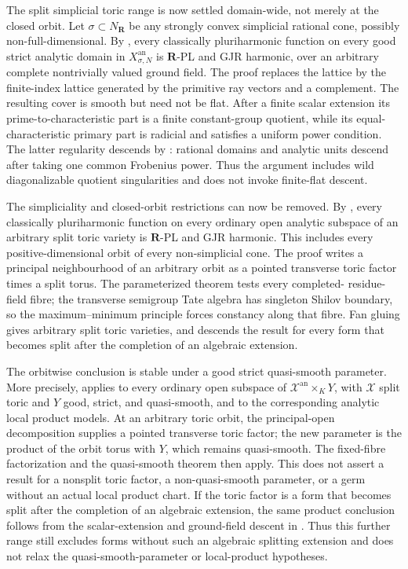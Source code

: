 The split simplicial toric range is now settled domain-wide, not merely at
the closed orbit.  Let \(\sigma\subset N_{\mathbf R}\) be any strongly
convex simplicial rational cone, possibly non-full-dimensional.  By
, every classically pluriharmonic
function on every good strict analytic domain in
\(X_{\sigma,N}^{\mathrm{an}}\) is \(\mathbf R\)-PL and GJR harmonic, over
an arbitrary complete nontrivially valued ground field.  The proof replaces
the lattice by the finite-index lattice generated by the primitive ray
vectors and a complement.  The resulting cover is smooth but need not be
flat.  After a finite scalar extension its prime-to-characteristic part is
a finite constant-group quotient, while its equal-characteristic primary
part is radicial and satisfies a uniform power condition.  The latter
regularity descends by : rational
domains and analytic units descend after taking one common Frobenius power.
Thus the argument includes wild diagonalizable quotient singularities and
does not invoke finite-flat descent.

The simpliciality and closed-orbit restrictions can now be removed.  By
, every classically pluriharmonic
function on every ordinary open analytic subspace of an arbitrary split
toric variety is \(\mathbf R\)-PL and GJR harmonic.  This includes every
positive-dimensional orbit of every non-simplicial cone.  The proof writes a
principal neighbourhood of an arbitrary orbit as a pointed transverse toric
factor times a split torus.  The parameterized theorem
 tests every completed-
residue-field fibre; the transverse semigroup Tate algebra has singleton
Shilov boundary, so the maximum--minimum principle forces constancy along
that fibre.  Fan gluing gives arbitrary split toric varieties, and
 descends the result for every
form that becomes split after the completion of an algebraic extension.

The orbitwise conclusion is stable under a good strict quasi-smooth
parameter.  More precisely,
 applies to every ordinary
open subspace of \(\mathcal X^{\mathrm{an}}\times_KY\), with
\(\mathcal X\) split toric and \(Y\) good, strict, and quasi-smooth, and
to the corresponding analytic local product models.  At an arbitrary toric
orbit, the principal-open decomposition supplies a pointed transverse toric
factor; the new parameter is the product of the orbit torus with \(Y\),
which remains quasi-smooth.  The fixed-fibre factorization and the
quasi-smooth theorem then apply.  This does not assert a result for a
nonsplit toric factor, a non-quasi-smooth parameter, or a germ without an
actual local product chart.
If the toric factor is a form that becomes split after the completion of an
algebraic extension, the same product conclusion follows from the
scalar-extension and ground-field descent in
.  Thus this further range still
excludes forms without such an algebraic splitting extension and does not
relax the quasi-smooth-parameter or local-product hypotheses.


